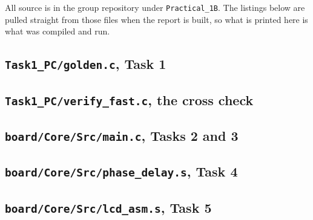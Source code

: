 \documentclass[11pt]{article}
\begin{document}
All source is in the group repository under \texttt{Practical\_1B}. The
listings below are pulled straight from those files when the report is built,
so what is printed here is what was compiled and run.

\subsection*{\texttt{Task1\_PC/golden.c}, Task 1}


\subsection*{\texttt{Task1\_PC/verify\_fast.c}, the cross check}


\subsection*{\texttt{board/Core/Src/main.c}, Tasks 2 and 3}


\subsection*{\texttt{board/Core/Src/phase\_delay.s}, Task 4}


\subsection*{\texttt{board/Core/Src/lcd\_asm.s}, Task 5}

\end{document}
